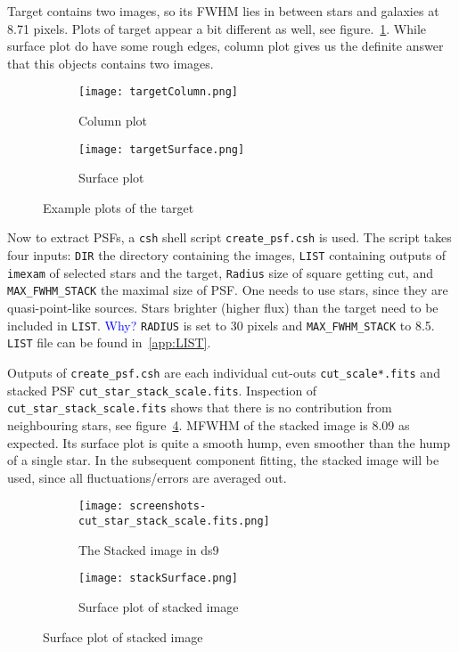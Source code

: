 Target contains two images, so its FWHM lies in between stars and galaxies at \num{8.71} pixels. Plots of target appear a bit different as well, see figure.~\ref{fig:targetPlots}. While surface plot do have some rough edges, column plot gives us the definite answer that this objects contains two images.
\begin{figure}[ht]
   \centering
   \begin{subfigure}[t]{0.5\textwidth}
   \begin{center}
   \texttt{[image: targetColumn.png]}
   \end{center}
   \caption{Column plot}
   \end{subfigure}%
   \begin{subfigure}[t]{0.5\textwidth}
   \begin{center}
   \texttt{[image: targetSurface.png]}
   \end{center}
   \caption{Surface plot}
   \end{subfigure}
   \caption{Example plots of the target}%
   \label{fig:targetPlots}
\end{figure}

Now to extract PSFs, a \verb|csh| shell script \verb|create_psf.csh| is used. The script takes four inputs: \verb|DIR| the directory containing the images, \verb|LIST| containing outputs of \verb|imexam| of selected stars and the target, \verb|Radius| size of square getting cut, and \verb|MAX_FWHM_STACK| the maximal size of PSF. One needs to use stars, since they are quasi-point-like sources. Stars brighter (higher flux) than the target need to be included in \verb|LIST|. \textcolor{blue}{Why?} \verb|RADIUS| is set to \num{30} pixels and \verb|MAX_FWHM_STACK| to \num{8.5}. \verb|LIST| file can be found in~\ref{app:LIST}.

Outputs of \verb|create_psf.csh| are each individual cut-outs \verb|cut_scale*.fits| and stacked PSF \verb|cut_star_stack_scale.fits|. Inspection of \verb|cut_star_stack_scale.fits| shows that there is no contribution from neighbouring stars, see figure~\ref{fig:stackSurface}. MFWHM of the stacked image is \num{8.09} as expected. Its surface plot is quite a smooth hump, even smoother than the hump of a single star. In the subsequent component fitting, the stacked image will be used, since all fluctuations/errors are averaged out.
\begin{figure}[ht]
	\begin{subfigure}[t]{0.5\textwidth}
	\begin{center}
		\texttt{[image: screenshots-cut\_star\_stack\_scale.fits.png]}
	\end{center}
	\caption{The Stacked image in ds9}%
	\label{fig:stackScrenn}
	\end{subfigure}%
	\centering
	\begin{subfigure}[t]{0.5\textwidth}
	\begin{center}
	\texttt{[image: stackSurface.png]}
	\end{center}
	\caption{Surface plot of stacked image}%
	\label{fig:stackSurface}
	\end{subfigure}
\end{figure}

